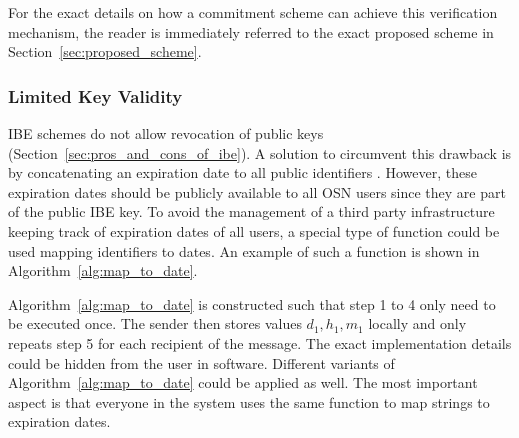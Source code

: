 For the exact details on how a commitment scheme can achieve this verification mechanism, the reader is immediately referred to the exact proposed scheme in Section~\ref{sec:proposed_scheme}.

\subsubsection{Limited Key Validity}
IBE schemes do not allow revocation of public keys (Section~\ref{sec:pros_and_cons_of_ibe}). A solution to circumvent this drawback is by concatenating an expiration date to all public identifiers \id{}. However, these expiration dates should be publicly available to all OSN users since they are part of the public IBE key. To avoid the management of a third party infrastructure keeping track of expiration dates of all users, a special type of function could be used mapping identifiers \id{} to dates. An example of such a function is shown in Algorithm~\ref{alg:map_to_date}.

Algorithm~\ref{alg:map_to_date} is constructed such that step 1 to 4 only need to be executed once. The sender then stores values $d_1, h_1, m_1$ locally and only repeats step 5 for each recipient of the message. The exact implementation details could be hidden from the user in software. Different variants of Algorithm~\ref{alg:map_to_date} could be applied as well. The most important aspect is that everyone in the system uses the same function to map strings to expiration dates.

